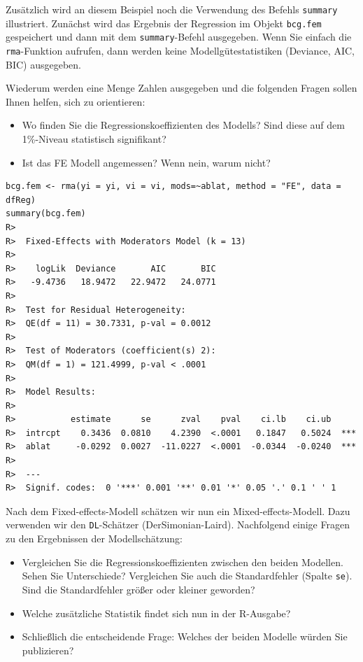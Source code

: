 \documentclass[normalheadings, 10pt]{scrartcl}\usepackage{graphicx, color}
\makeatletter
\newenvironment{kframe}{%
 \def\at@end@of@kframe{}%
 \ifinner\ifhmode%
  \def\at@end@of@kframe{\end{minipage}}%
  \begin{minipage}{\columnwidth}%
 \fi\fi%
 \def\FrameCommand##1{\hskip\@totalleftmargin \hskip-\fboxsep
 \colorbox{shadecolor}{##1}\hskip-\fboxsep
     \hskip-\linewidth \hskip-\@totalleftmargin \hskip\columnwidth}%
 \MakeFramed {\advance\hsize-\width
   \@totalleftmargin\z@ \linewidth\hsize
   \@setminipage}}%
 {\par\unskip\endMakeFramed%
 \at@end@of@kframe}
\newenvironment{knitrout}{}{} %
\newcommand{\code}[1]{\texttt{#1}}
\makeatother
\begin{document}
Zusätzlich wird an diesem Beispiel noch die Verwendung des Befehls
\code{summary} illustriert. Zunächst wird das Ergebnis der Regression im Objekt
\code{bcg.fem} gespeichert und dann mit dem \code{summary}-Befehl
ausgegeben. Wenn Sie einfach die \code{rma}-Funktion aufrufen, dann werden keine
Modellgütestatistiken (Deviance, AIC, BIC) ausgegeben.

Wiederum werden eine Menge Zahlen ausgegeben und die folgenden Fragen sollen
Ihnen helfen, sich zu orientieren:
\begin{itemize}
\item Wo finden Sie die Regressionskoeffizienten des Modells? Sind diese auf dem
  1\%-Niveau statistisch signifikant?
\item Ist das FE Modell angemessen? Wenn nein, warum nicht?
\end{itemize}

\begin{rbsp}
\begin{knitrout}
\color{fgcolor}\begin{kframe}
\begin{verbatim}
bcg.fem <- rma(yi = yi, vi = vi, mods=~ablat, method = "FE", data = dfReg)
summary(bcg.fem)
R>  
R>  Fixed-Effects with Moderators Model (k = 13)
R>  
R>    logLik  Deviance       AIC       BIC  
R>   -9.4736   18.9472   22.9472   24.0771  
R>  
R>  Test for Residual Heterogeneity: 
R>  QE(df = 11) = 30.7331, p-val = 0.0012
R>  
R>  Test of Moderators (coefficient(s) 2): 
R>  QM(df = 1) = 121.4999, p-val < .0001
R>  
R>  Model Results:
R>  
R>           estimate      se      zval    pval    ci.lb    ci.ub     
R>  intrcpt    0.3436  0.0810    4.2390  <.0001   0.1847   0.5024  ***
R>  ablat     -0.0292  0.0027  -11.0227  <.0001  -0.0344  -0.0240  ***
R>  
R>  ---
R>  Signif. codes:  0 '***' 0.001 '**' 0.01 '*' 0.05 '.' 0.1 ' ' 1
\end{verbatim}
\end{kframe}
\end{knitrout}

\end{rbsp}

Nach dem Fixed-effects-Modell schätzen wir nun ein Mixed-effects-Modell. Dazu
verwenden wir den \code{DL}-Schätzer (DerSimonian-Laird). Nachfolgend einige
Fragen zu den Ergebnissen der Modellschätzung:
\begin{itemize}
\item Vergleichen Sie die Regressionskoeffizienten zwischen den beiden
  Modellen. Sehen Sie Unterschiede? Vergleichen Sie auch die Standardfehler
  (Spalte \code{se}). Sind die Standardfehler größer oder kleiner geworden?
\item Welche zusätzliche Statistik findet sich nun in der R-Ausgabe?
\item Schließlich die entscheidende Frage: Welches der beiden Modelle würden Sie
  publizieren?
\end{itemize}
\end{document}

